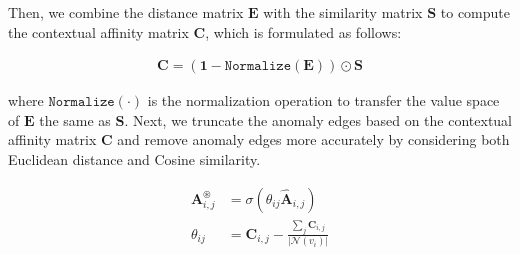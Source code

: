 \documentclass{article}
\begin{document}
Then, we combine the distance matrix $\mathbf{E}$ with the similarity matrix $\mathbf{S}$ to compute the contextual affinity matrix $\mathbf{C}$, which is formulated as follows:

\begin{equation}
\begin{aligned}
\mathbf{C}= (\mathbf{1}-\mathtt{Normalize}(\mathbf{E})) \odot \mathbf{S}
    \label{eq: ca}
\end{aligned}
\end{equation}

where $\mathtt{Normalize}(\cdot)$ is the normalization operation to transfer the value space of $\mathbf{E}$ the same as $\mathbf{S}$. 
Next, we truncate the anomaly edges based on the contextual affinity matrix $\mathcal{\mathbf{C}}$ and remove anomaly edges more accurately by considering both Euclidean distance and Cosine similarity.

\begin{equation}
\begin{aligned}
    \mathbf{A}_{i,j}^{\circledast} &= \sigma \left( \theta_{ij} \hat{\mathbf{A}}_{i,j}\right)\\
    \theta_{ij} &=  \mathbf{C}_{i,j} - \frac{\sum_j \mathbf{C}_{i,j}}{|\mathcal{N}(v_i)|} 
\end{aligned}
\label{eq: truncation matrix}
\end{equation}




\end{document}
